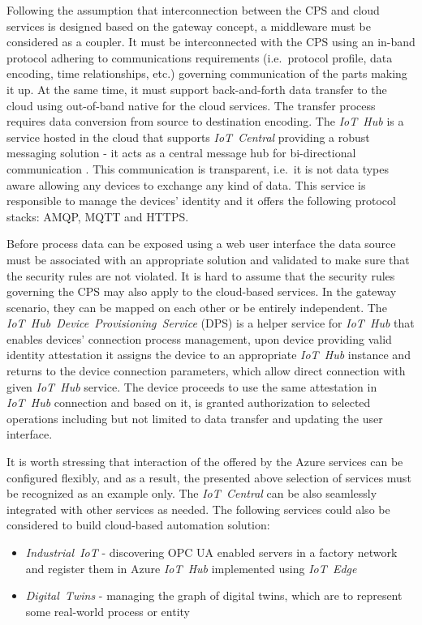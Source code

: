 \documentclass{article}
\begin{document}
Following the assumption that interconnection between the CPS and cloud services is designed based on the gateway concept, a middleware must be considered as a coupler. It must be interconnected with the CPS using an in-band protocol adhering to communications requirements (i.e.~protocol profile, data encoding, time relationships, etc.) governing communication of the parts making it up. At the same time, it must support back-and-forth data transfer to the cloud using out-of-band native for the cloud services. The transfer process requires data conversion from source to destination encoding. The \textit{IoT\ Hub} is a service hosted in the cloud that supports \textit{IoT\ Central} providing a robust messaging solution - it acts as a central message hub for bi-directional communication . This communication is transparent, i.e.~it is not data types aware allowing
any devices to exchange any kind of data. This service is responsible to manage the devices' identity and it offers the following protocol stacks: AMQP, MQTT and HTTPS.

Before process data can be exposed using a web user interface the data source must be associated with an appropriate solution and validated to make sure that the security rules are not violated. It is hard to assume that the security rules governing the CPS may also apply to the cloud-based services. In the gateway scenario, they can be mapped on each other or be entirely independent. The \textit{IoT\ Hub\ Device\ Provisioning\ Service} (DPS) is a helper service for \textit{IoT\ Hub} that enables devices' connection process management, upon device providing valid identity attestation it assigns the device to an appropriate \textit{IoT\ Hub} instance and returns to the device connection parameters, which allow direct connection with given \textit{IoT\ Hub} service. The device proceeds to use the same attestation in \textit{IoT\ Hub} connection and based on it, is granted authorization to selected operations including but not limited to data transfer and updating the user interface.

It is worth stressing that interaction of the offered by the Azure
services can be configured flexibly, and as a result, the presented
above selection of services must be recognized as an example only. The
\textit{IoT\ Central} can be also seamlessly integrated with other
services as needed. The following services could also be considered to
build cloud-based automation solution:

\begin{itemize}
      \item \textit{Industrial\ IoT} - discovering OPC UA enabled servers in a factory network and register them in Azure \textit{IoT\ Hub} implemented using \textit{IoT\ Edge}
      \item \textit{Digital\ Twins} - managing the graph of digital twins, which are to represent some real-world process or entity
\end{itemize}
\end{document}
